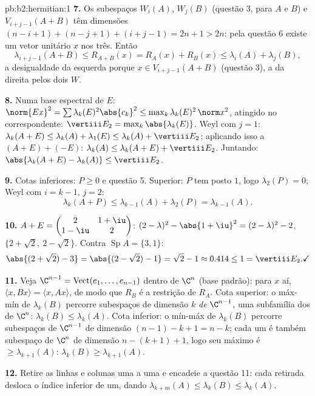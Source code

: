 \begin{solution}{pb:b2:hermitian:1}
\textbf{7.} Os subespaços $W_i(A)$, $W_j(B)$ (questão 3, para
$A$ e $B$) e $V_{i+j-1}(A+B)$ têm dimensões $(n-i+1) +
(n-j+1) + (i+j-1) = 2n + 1 > 2n$: pela questão 6 existe um vetor
unitário $x$ nos três. Então
\[
\lambda_{i+j-1}(A+B) \leq R_{A+B}(x)
= R_A(x) + R_B(x) \leq \lambda_i(A) + \lambda_j(B),
\]
a desigualdade da esquerda porque $x \in V_{i+j-1}(A+B)$ (questão
3), a da direita pelos dois $W$.

\textbf{8.} Numa base espectral de $E$: $\norm{Ex}^2 = \sum
\lambda_k(E)^2\abs{c_k}^2 \leq \max_k\lambda_k(E)^2\,\norm
x^2$, atingido no  correspondente: $\vertiii E_2
= \max_k\abs{\lambda_k(E)}$. Weyl com $j = 1$: $\lambda_k(A+E)
\leq \lambda_k(A) + \lambda_1(E) \leq \lambda_k(A) + \vertiii
E_2$; aplicando isso a $(A+E) + (-E)$: $\lambda_k(A) \leq
\lambda_k(A+E) + \vertiii E_2$. Juntando:
$\abs{\lambda_k(A+E) - \lambda_k(A)} \leq \vertiii E_2$.

\textbf{9.} Cotas inferiores: $P \geq 0$ e questão 5. Superior: $P$
tem posto $1$, logo $\lambda_2(P) = 0$; Weyl com $i = k-1$, $j =
2$:
\[
\lambda_k(A + P) \leq \lambda_{k-1}(A) + \lambda_2(P)
= \lambda_{k-1}(A) .
\]

\textbf{10.} $A + E = \begin{pmatrix} 2 & 1+\iu\\ 1-\iu &
2\end{pmatrix}$:  $(2-\lambda)^2 -
\abs{1+\iu}^2 = (2-\lambda)^2 - 2$,  $\{2 + \sqrt2,\ 2
- \sqrt2\}$. Contra $\operatorname{Sp}A = \{3, 1\}$:
\[
\abs{(2+\sqrt2) - 3} = \abs{(2-\sqrt2) - 1} = \sqrt2 - 1
\approx 0.414 \leq 1 = \vertiii E_2 . \checkmark
\]

\textbf{11.} Veja $\C^{n-1} = \operatorname{Vect}(e_1, \dots,
e_{n-1})$ dentro de $\C^n$ (base padrão): para $x$ aí,
$\langle x, Bx\rangle = \langle x, Ax\rangle$, de modo que $R_B$ é a
restrição de $R_A$. Cota superior: o máx-mín de $\lambda_k
(B)$ percorre subespaços de dimensão $k$ \emph{de}
$\C^{n-1}$, uma subfamília dos de $\C^n$: $\lambda_k(B) \leq
\lambda_k(A)$. Cota inferior: o mín-máx de $\lambda_k(B)$
percorre subespaços de $\C^{n-1}$ de dimensão $(n-1)-k+1 =
n-k$; cada um é também subespaço de $\C^n$ de dimensão $n -
(k+1) + 1$, logo seu máximo é $\geq \lambda_{k+1}(A)$:
$\lambda_k(B) \geq \lambda_{k+1}(A)$.

\textbf{12.} Retire as linhas e colunas uma a uma e encadeie a
questão 11: cada retirada desloca o índice inferior de um, dando
$\lambda_{k+m}(A) \leq \lambda_k(B) \leq \lambda_k(A)$.


\end{solution}
